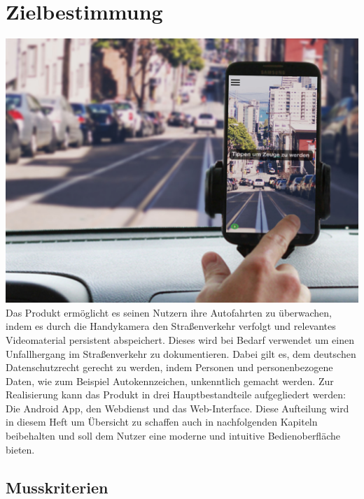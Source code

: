\chapter{Zielbestimmung}

\includegraphics[width=\textwidth]{subtopicsFuncspec/Res//Mockups/Portrait_camera_view_car.jpg}\\[0.5cm]

Das Produkt ermöglicht es seinen Nutzern ihre Autofahrten zu überwachen, indem es durch die Handykamera den Straßenverkehr verfolgt und relevantes Videomaterial persistent abspeichert. Dieses wird bei Bedarf verwendet um einen Unfallhergang im Straßenverkehr zu dokumentieren. Dabei gilt es, dem deutschen Datenschutzrecht gerecht zu werden, indem Personen und personenbezogene Daten, wie zum Beispiel Autokennzeichen, unkenntlich gemacht werden.\newline
Zur Realisierung kann das Produkt in drei Hauptbestandteile aufgegliedert werden: Die Android App, den Webdienst und das Web-Interface. Diese Aufteilung wird in diesem Heft um Übersicht zu schaffen auch in nachfolgenden Kapiteln beibehalten und soll dem Nutzer eine moderne und intuitive Bedienoberfläche bieten.

\section{Musskriterien}
